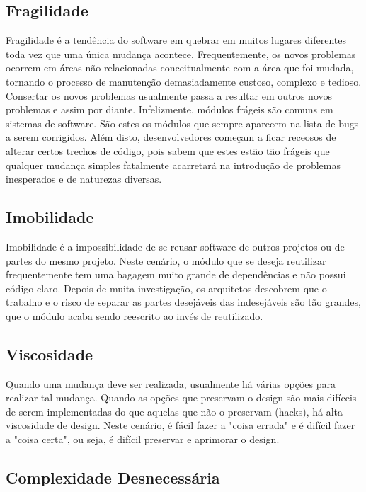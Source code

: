 \subsection{Fragilidade}

Fragilidade é a tendência do software em quebrar em muitos lugares diferentes toda vez que uma única mudança acontece. Frequentemente, os novos problemas ocorrem em áreas não relacionadas conceitualmente com a área que foi mudada, tornando o processo de manutenção demasiadamente custoso, complexo e tedioso. Consertar os novos problemas usualmente passa a resultar em outros novos problemas e assim por diante. Infelizmente, módulos frágeis são comuns em sistemas de software. São estes os módulos que sempre aparecem na lista de bugs a serem corrigidos. Além disto, desenvolvedores começam a ficar receosos de alterar certos trechos de código, pois sabem que estes estão tão frágeis que qualquer mudança simples fatalmente acarretará na introdução de problemas inesperados e de naturezas diversas. 


\subsection{Imobilidade}

Imobilidade é a impossibilidade de se reusar software de outros projetos ou de partes do mesmo projeto. Neste cenário, o módulo que se deseja reutilizar frequentemente tem uma bagagem muito grande de dependências e não possui código claro. Depois de muita investigação, os arquitetos descobrem que o trabalho e o risco de separar as partes desejáveis das indesejáveis são tão grandes, que o módulo acaba sendo reescrito ao invés de reutilizado.

\subsection{Viscosidade}

Quando uma mudança deve ser realizada, usualmente há várias opções para realizar tal mudança. Quando as opções que preservam o design são mais difíceis de serem implementadas do que aquelas que não o preservam (hacks), há alta viscosidade de design. Neste cenário, é fácil fazer a "coisa errada" e é difícil fazer a "coisa certa", ou seja, é difícil preservar e aprimorar o design.

\subsection{Complexidade Desnecessária}

